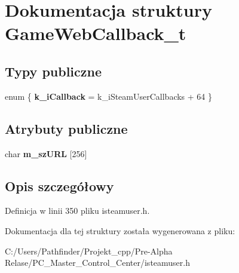 \hypertarget{struct_game_web_callback__t}{}\section{Dokumentacja struktury Game\+Web\+Callback\+\_\+t}
\label{struct_game_web_callback__t}
\subsection*{Typy publiczne}
\begin{DoxyCompactItemize}
\item 
\mbox{\label{struct_game_web_callback__t_ac65db7b08547b12bd1896e732d1b6522}} 
enum \{ {\bfseries k\+\_\+i\+Callback} = k\+\_\+i\+Steam\+User\+Callbacks + 64
 \}
\end{DoxyCompactItemize}
\subsection*{Atrybuty publiczne}
\begin{DoxyCompactItemize}
\item 
\mbox{\label{struct_game_web_callback__t_a3dfa54118aea9f7d3e233833759174db}} 
char {\bfseries m\+\_\+sz\+U\+RL} \mbox{[}256\mbox{]}
\end{DoxyCompactItemize}


\subsection{Opis szczegółowy}


Definicja w linii 350 pliku isteamuser.\+h.



Dokumentacja dla tej struktury została wygenerowana z pliku\+:\begin{DoxyCompactItemize}
\item 
C\+:/\+Users/\+Pathfinder/\+Projekt\+\_\+cpp/\+Pre-\/\+Alpha Relase/\+P\+C\+\_\+\+Master\+\_\+\+Control\+\_\+\+Center/isteamuser.\+h\end{DoxyCompactItemize}
